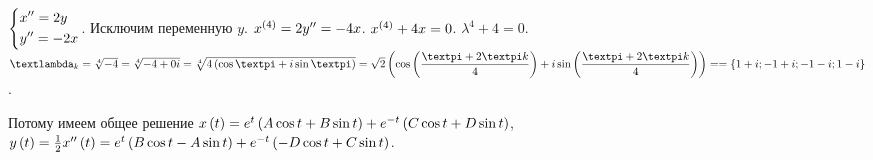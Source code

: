 \documentclass[a5paper,10pt]{article}
\begin{document}
$\left\{ \begin{aligned}
    & x'' = 2y \\
    & y'' = -2x
\end{aligned} \right.$. Исключим переменную $y$. $x^{\left(4\right)} = 2y'' = -4x$. $x^{\left(4\right)} + 4x = 0$. $\lambda^4 + 4 = 0$. $\lambda_{k} = \sqrt[4]{-4} = \sqrt[4]{-4 + 0i} = \sqrt[4]{4\br{\cos \pi + i \sin \pi}} = \sqrt{2} \br{ \cos \br{\dfrac {\pi + 2 \pi k} {4}} + i \sin \br{\dfrac {\pi + 2 \pi k} {4}} } = \linebreak = \cbr{1 + i; -1 + i; -1 - i; 1 - i}$.

Потому имеем общее решение $x\left(t\right) = e^{t} \left(A \cos t + B \sin t\right) + e^{-t} \left(C \cos t + D \sin t\right)$, $y\left(t\right) = \frac {1} {2} x''\left(t\right) = e^{t} \left(B \cos t - A \sin t\right) + e^{-t} \left(-D \cos t + C \sin t\right)$.
\end{document}

